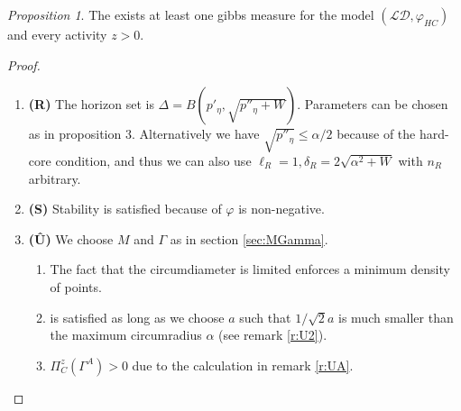 \documentclass[12pt,a4paper]{article}
\theoremstyle{definition}
\theoremstyle{remark}
\theoremstyle{theorem}
\newtheorem{proposition}{Proposition}
\begin{document}
\begin{proposition}
	The exists at least one gibbs measure for the model $(\mathcal {LD},\varphi_{HC})$ and every activity $z>0$.
\end{proposition}
\begin{proof}
\begin{enumerate}[]
	\item \textbf{(R)} The horizon set is $\Delta = B(p'_\eta,\sqrt{p''_\eta +W})$. Parameters can be chosen as in proposition 3. Alternatively we have $ \sqrt{p''_\eta} \leq \alpha/2$ because of the hard-core condition, and thus we can also use $\ell_R = 1, \delta_R = 2 \sqrt{\alpha^2 + W}$ with $n_R$ arbitrary. 
	\item \textbf{(S)} Stability is satisfied because of $\varphi$ is non-negative.
	\item \textbf{(\^{U})} We choose $M$ and $\Gamma$ as in section \ref{sec:MGamma}.
		\begin{enumerate}[(\^{U}1)]
			\item {} The fact that the circumdiameter is limited enforces a minimum density of points.
			\item {} is satisfied as long as we choose $a$ such that $1/\sqrt{2} a$ is much smaller than the maximum circumradius $\alpha$ (see remark \ref{r:U2}).
			\item $\Pi^z_C(\Gamma^A) >0$ due to the calculation in remark \ref{r:UA}.
		\end{enumerate}
\end{enumerate}
\end{proof}





\listoftodos
\end{document}
